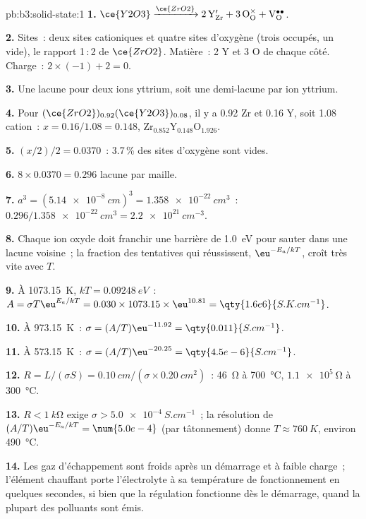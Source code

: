 \begin{solution}{pb:b3:solid-state:1}
\textbf{1.} $\ce{Y2O3} \xrightarrow{\ce{ZrO2}} \mathrm{2\,Y_{Zr}' + 3\,O_O^{\times} + V_O^{\bullet\bullet}}$.

\textbf{2.} Sites~: deux sites cationiques et quatre sites d'oxygène (trois occupés, un vide),
le rapport 1\,:\,2 de $\ce{ZrO2}$. Matière~: 2 Y et 3 O de chaque côté. Charge~: $2 \times (-1) + 2 = 0$.

\textbf{3.} Une lacune pour deux ions yttrium, soit une demi-lacune par ion yttrium.

\textbf{4.} Pour $(\ce{ZrO2})_{0.92}(\ce{Y2O3})_{0.08}$, il y a 0.92 Zr et 0.16 Y, soit 1.08 cation~: $x = 0.16/1.08 = 0.148$,
$\mathrm{Zr_{0.852}Y_{0.148}O_{1.926}}$.

\textbf{5.} $(x/2)/2 = 0.0370$~: 3.7\,\% des sites d'oxygène sont vides.

\textbf{6.} $8 \times 0.0370 = 0.296$ lacune par maille.

\textbf{7.} $a^3 = (\qty{5.14e-8}{cm})^3 = \qty{1.358e-22}{cm^3}$~: $0.296/\qty{1.358e-22}{cm^3} = \qty{2.2e21}{cm^{-3}}$.

\textbf{8.} Chaque ion oxyde doit franchir une barrière de \qty{1.0}{eV}
pour sauter dans une lacune voisine~; la fraction des tentatives qui réussissent, $\eu^{-E_a/kT}$, croît très vite avec $T$.

\textbf{9.} À \qty{1073.15}{K}, $kT = \qty{0.09248}{eV}$~: $A = \sigma T\eu^{E_a/kT} = 0.030 \times 1073.15 \times \eu^{10.81} = \qty{1.6e6}{S.K.cm^{-1}}$.

\textbf{10.} À \qty{973.15}{K}~: $\sigma = (A/T)\eu^{-11.92} = \qty{0.011}{S.cm^{-1}}$.

\textbf{11.} À \qty{573.15}{K}~: $\sigma = (A/T)\eu^{-20.25} = \qty{4.5e-6}{S.cm^{-1}}$.

\textbf{12.} $R = L/(\sigma S) = \qty{0.10}{cm}/(\sigma \times \qty{0.20}{cm^2})$~: \qty{46}{\ohm} à \qty{700}{\celsius}, $\qty{1.1e5}{\ohm}$ à \qty{300}{\celsius}.

\textbf{13.} $R < \qty{1}{k\ohm}$ exige $\sigma > \qty{5.0e-4}{S.cm^{-1}}$~; la résolution de $(A/T)\eu^{-E_a/kT} = \num{5.0e-4}$ (par tâtonnement)
donne $T \approx \qty{760}{K}$, environ \qty{490}{\celsius}.

\textbf{14.} Les gaz d'échappement sont froids après un démarrage et à
faible charge~; l'élément chauffant porte l'électrolyte à sa température de
fonctionnement en quelques secondes, si bien que la régulation fonctionne
dès le démarrage, quand la plupart des polluants sont émis.


\end{solution}
